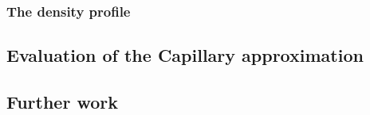 



\subsubsection{The density profile}

\subsection{Evaluation of the Capillary approximation}

\subsection{Further work}








